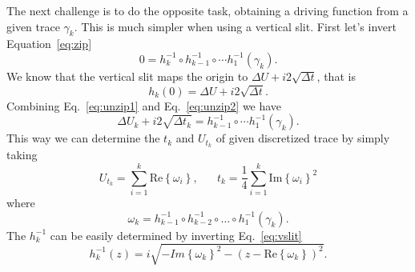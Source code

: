 The next challenge is to do the opposite task, obtaining a driving function
from a given trace $\gamma_k$. This is much simpler when using a vertical slit.
First let's invert Equation~\ref{eq:zip}
\begin{equation}
    \label{eq:unzip1}
    0=h_{k}^{-1}\circ h_{k-1}^{-1}\circ\cdots h_{1}^{-1}\left(\gamma_{k}\right).
\end{equation}
We know that the vertical slit maps the origin to $\Delta U+i2\sqrt{\Delta t}$,
that is
\begin{equation}
    \label{eq:unzip2}
    h_{k}\left(0\right)=\Delta U+i2\sqrt{\Delta t}.
\end{equation}
Combining Eq.~\ref{eq:unzip1} and Eq.~\ref{eq:unzip2} we have    
\begin{equation}
    \Delta U_{k}+i2\sqrt{\Delta t_{k}}=
    h_{k-1}^{-1}\circ\cdots h_{1}^{-1}\left(\gamma_{k}\right).
\end{equation}
This way we can determine the $t_k$ and $U_{t_k}$ of given discretized
trace by simply taking
\begin{equation}
    U_{t_k}=\sum_{i=1}^{k}\mbox{Re}\left\{ \omega_{i}\right\},
    \,\,\,\,\,\,\,\,\,\,
    t_{k}=\frac{1}{4}\sum_{i=1}^{k}\mbox{Im}\left\{ \omega_{i}\right\} ^{2}
\end{equation}
where
\begin{equation}
    \omega_{k}=h_{k-1}^{-1}\circ h_{k-2}^{-1}\circ
        \ldots\circ h_{1}^{-1}\left(\gamma_{k}\right).
\end{equation}
The $h_k^{-1}$ can be easily determined by inverting Eq.~\ref{eq:vslit}
\begin{equation}
    h_{k}^{-1}\left(z\right)=
    i\sqrt{-Im{\left\{ \omega_{k}\right\}}^{2}
           -{\left(z-\mbox{Re}\left\{ \omega_{k}\right\} \right)}^{2}}.
\end{equation}

